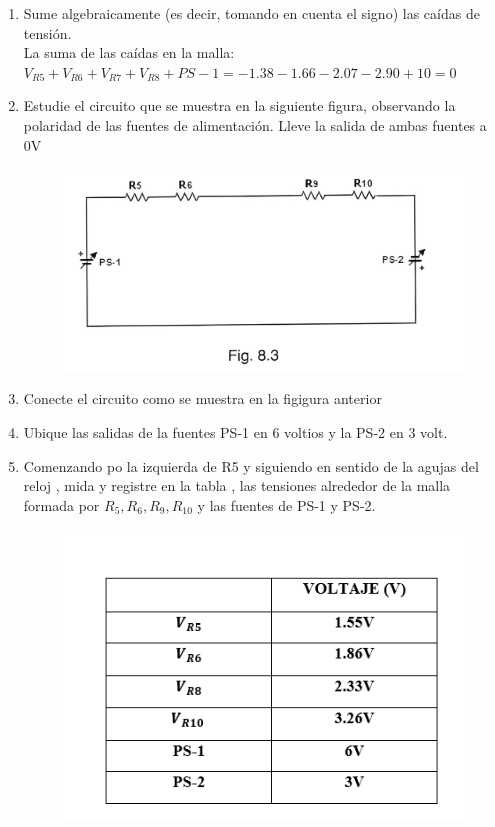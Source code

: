 \begin{enumerate}
	\item Sume algebraicamente (es decir, tomando en cuenta el signo) las caídas de tensión.\\
	La suma de las caídas en la malla: $V_{R5}+V_{R6}+V_{R7}+V_{R8}+PS-1= -1.38-1.66-2.07-2.90+10=0$
	\item Estudie el circuito que se muestra en la siguiente figura, observando la polaridad de las fuentes de alimentación. Lleve la salida de ambas fuentes a 0V
	\begin{figure}[h]
		\centering 
		\includegraphics[scale=0.2]{imagenes/3}
	\end{figure}
	\item Conecte el circuito como se muestra en la figigura anterior
	\item Ubique las salidas de la fuentes PS-1 en 6 voltios y la PS-2  en 3 volt.
	\item Comenzando po la izquierda de R5 y siguiendo en sentido de la agujas del reloj , mida y registre en la tabla , las tensiones alrededor de la malla formada por $R_{5},R_{6}, R_{9},R_{10}$ y las fuentes de PS-1 y PS-2.
	\begin{figure}[h]
		\centering
		\includegraphics[scale=1.2]{imagenes/5}

\end{figure}
\end{enumerate}

